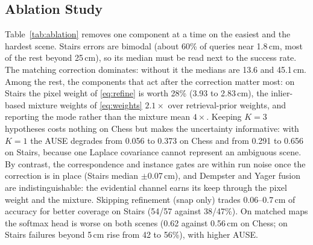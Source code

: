 \documentclass[journal]{IEEEtran}
\begin{document}
\subsection{Ablation Study}
\label{sec:ablation}
Table~\ref{tab:ablation} removes one component at a time on the easiest and the hardest scene. Stairs errors are bimodal (about 60\% of queries near 1.8\,cm, most of the rest beyond 25\,cm), so its median must be read next to the success rate. The matching correction dominates: without it the medians are 13.6 and 45.1\,cm. Among the rest, the components that act after the correction matter most: on Stairs the pixel weight of \eqref{eq:refine} is worth 28\% (3.93 to 2.83\,cm), the inlier-based mixture weights of \eqref{eq:weights} $2.1\times$ over retrieval-prior weights, and reporting the mode rather than the mixture mean $4\times$. Keeping $K{=}3$ hypotheses costs nothing on Chess but makes the uncertainty informative: with $K{=}1$ the AUSE degrades from 0.056 to 0.373 on Chess and from 0.291 to 0.656 on Stairs, because one Laplace covariance cannot represent an ambiguous scene. By contrast, the correspondence and instance gates are within run noise once the correction is in place (Stairs median $\pm$0.07\,cm), and Dempster and Yager fusion are indistinguishable: the evidential channel earns its keep through the pixel weight and the mixture. Skipping refinement (snap only) trades 0.06--0.7\,cm of accuracy for better coverage on Stairs (54/57 against 38/47\%). On matched maps the softmax head is worse on both scenes (0.62 against 0.56\,cm on Chess; on Stairs failures beyond 5\,cm rise from 42 to 56\%), with higher AUSE.
\end{document}
